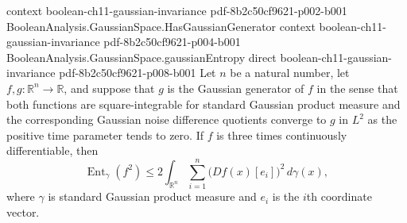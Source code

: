 \begin{theorem}
  {context}
  {boolean-ch11-gaussian-invariance}
  {pdf-8b2c50cf9621-p002-b001}
\proofstep
  {BooleanAnalysis.GaussianSpace.HasGaussianGenerator}
  {context}
  {boolean-ch11-gaussian-invariance}
  {pdf-8b2c50cf9621-p004-b001}
\proofstep
  {BooleanAnalysis.GaussianSpace.gaussianEntropy}
  {direct}
  {boolean-ch11-gaussian-invariance}
  {pdf-8b2c50cf9621-p008-b001}
Let $n$ be a natural number, let $f,g:\mathbb R^n\to\mathbb R$, and suppose that $g$ is
the Gaussian generator of $f$ in the sense that both functions are square-integrable for
standard Gaussian product measure and the corresponding Gaussian noise difference
quotients converge to $g$ in $L^2$ as the positive time parameter tends to zero. If $f$
is three times continuously differentiable, then
\[
\operatorname{Ent}_\gamma(f^2)\le 2\int_{\mathbb
R^n}\sum_{i=1}^n\bigl(Df(x)[e_i]\bigr)^2\,d\gamma(x),
\]
where $\gamma$ is standard Gaussian product measure and $e_i$ is the $i$th coordinate
vector.
\end{theorem}
